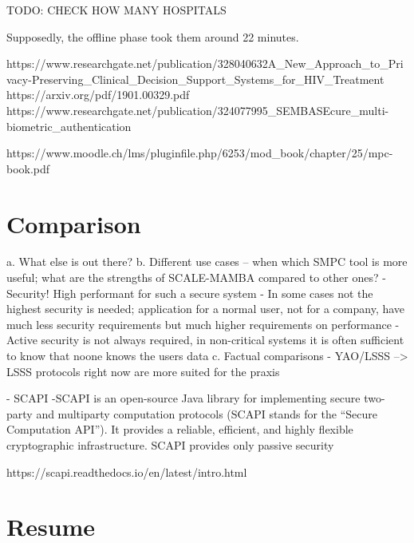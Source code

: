 \documentclass[english,runningheads,a4paper]{llncs}[2018/03/10]
\begin{document}
TODO: CHECK HOW MANY HOSPITALS


Supposedly, the offline phase took them around 22 minutes. 




https://www.researchgate.net/publication/328040632A\_New\_Approach\_to\_Privacy-Preserving\_Clinical\_Decision\_Support\_Systems\_for\_HIV\_Treatment
https://arxiv.org/pdf/1901.00329.pdf
https://www.researchgate.net/publication/324077995\_SEMBASEcure\_multi-biometric\_authentication

https://www.moodle.ch/lms/pluginfile.php/6253/mod\_book/chapter/25/mpc-book.pdf

\section{Comparison}\label{sec:comparison}


a.	What else is out there?
b.	Different use cases – when which SMPC tool is more useful; what are the strengths of SCALE-MAMBA compared to other ones?
	- Security! High performant for such a secure system
	- In some cases not the highest security is needed; application for a normal user, not for a company, have much less security requirements but much higher requirements on performance
	- Active security is not always required, in non-critical systems it is often sufficient to know that noone knows the users data
c.	Factual comparisons
	- YAO/LSSS --> LSSS protocols right now are more suited for the praxis

	- SCAPI
	-SCAPI is an open-source Java library for implementing secure two-party and multiparty computation protocols (SCAPI stands for the “Secure Computation API”). It provides a reliable, 	efficient, and highly flexible cryptographic infrastructure.
SCAPI provides only passive security

https://scapi.readthedocs.io/en/latest/intro.html


\section{Resume}\label{sec:outlook}
\end{document}

